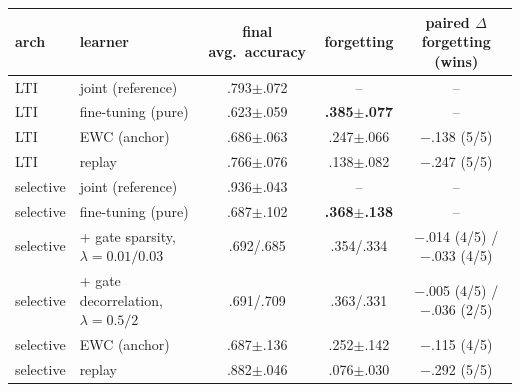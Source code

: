 \begin{tabular}{llccc}
\toprule
arch & learner & final avg.\ accuracy & forgetting & paired $\Delta$ forgetting (wins) \\
\midrule
LTI & joint (reference) & .793$\pm$.072 & -- & -- \\
LTI & fine-tuning (pure) & .623$\pm$.059 & \textbf{.385$\pm$.077} & -- \\
LTI & EWC (anchor) & .686$\pm$.063 & .247$\pm$.066 & $-$.138 (5/5) \\
LTI & replay & .766$\pm$.076 & .138$\pm$.082 & $-$.247 (5/5) \\
selective & joint (reference) & .936$\pm$.043 & -- & -- \\
selective & fine-tuning (pure) & .687$\pm$.102 & \textbf{.368$\pm$.138} & -- \\
selective & + gate sparsity, $\lambda=0.01/0.03$ & .692/.685 & .354/.334 & $-$.014 (4/5) / $-$.033 (4/5) \\
selective & + gate decorrelation, $\lambda=0.5/2$ & .691/.709 & .363/.331 & $-$.005 (4/5) / $-$.036 (2/5) \\
selective & EWC (anchor) & .687$\pm$.136 & .252$\pm$.142 & $-$.115 (4/5) \\
selective & replay & .882$\pm$.046 & .076$\pm$.030 & $-$.292 (5/5) \\
\bottomrule
\end{tabular}
